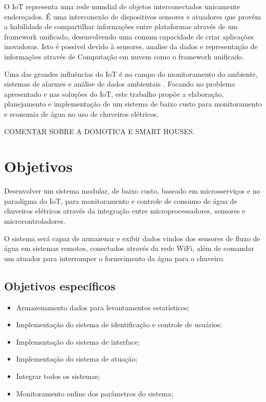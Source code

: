O IoT representa uma rede mundial de objetos interconectados unicamente endereçados. É uma interconexão de dispositivos sensores e atuadores que provêm a habilidade de compartilhar informações entre plataformas através de um framework unificado, desenvolvendo uma comum capacidade de criar aplicações inovadoras. Isto é possível devido à sensores, analise da dados e representação de informações através de Computação em nuvem como o framework unificado. \cite{RisteskaStojkoska2017}

Uma das grandes influências do IoT é no campo do monitoramento do ambiente, sistemas de alarmes e análise de dados ambientais \cite{Perumal2016}. Focando no problema apresentado e nas soluções do IoT, este trabalho propõe a elaboração, planejamento e implementação de um sistema de baixo custo para monitoramento e economia de água no uso de chuveiros elétricos.

COMENTAR SOBRE A DOMOTICA E SMART HOUSES.

\section{Objetivos}

Desenvolver um sistema modular, de baixo custo, baseado em microsserviços e no paradigma do IoT, para monitoramento e controle de consumo de água de chuveiros elétricos através da integração entre microprocessadores, sensores e microcontroladores. 

O sistema será capaz de armazenar e exibir dados vindos dos sensores de fluxo de água em sistemas remotos, conectados através da rede WiFi, além de comandar um atuador para interromper o fornecimento da água para o chuveiro.

\subsection{Objetivos específicos}

\begin{itemize}
	\item Armazenamento dados para levantamentos estatísticos;
	\item Implementação do sistema de identificação e controle de usuários;
	\item Implementação do sistema de interface;
	\item Implementação do sistema de atuação;
	\item Integrar todos os sistemas;
	\item Monitoramento online dos parâmetros do sistema;
\end{itemize}

